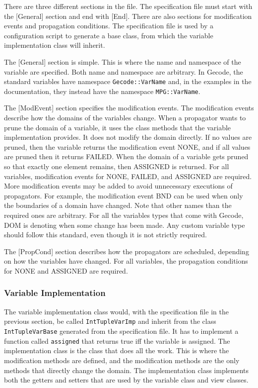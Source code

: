 \documentclass[a4paper,11pt]{article}
\begin{document}
There are three different sections in the file. The specification file must start with the [General] section and end with [End]. There are also sections for modification events and propagation conditions. The specification file is used by a configuration script to generate a base class, from which the variable implementation class will inherit.

The [General] section is simple. This is where the name and namespace of the variable are specified. Both name and namespace are arbitrary. In Gecode, the standard variables have namespace \texttt{Gecode::VarName} and, in the examples in the documentation, they instead have the namespace \texttt{MPG::VarName}.

The [ModEvent] section specifies the modification events. The modification events describe how the domains of the variables change. When a propagator wants to prune the domain of a variable, it uses the class methods that the variable implementation provides. It does not modify the domain directly. If no values are pruned, then the variable returns the modification event NONE, and if all values are pruned then it returns FAILED. When the domain of a variable gets pruned so that exactly one element remains, then ASSIGNED is returned. For all variables, modification events for NONE, FAILED, and ASSIGNED are required. More modification events may be added to avoid unnecessary executions of propagators. For example, the modification event BND can be used when only the boundaries of a domain have changed. Note that other names than the required ones are arbitrary. For all the variables types that come with Gecode, DOM is denoting when some change has been made. Any custom variable type should follow this standard, even though it is not strictly required.

The [PropCond] section describes how the propagators are scheduled, depending on how the variables have changed. For all variables, the propagation conditions for NONE and ASSIGNED are required.

\subsubsection{Variable Implementation}
The variable implementation class would, with the specification file in the previous section, be called \texttt{IntTupleVarImp} and inherit from the class \texttt{IntTupleVarBase} generated from the specification file. It has to implement a function called \texttt{assigned} that returns true iff the variable is assigned. The implementation class is the class that does all the work. This is where the modification methods are defined, and the modification methods are the only methods that directly change the domain. The implementation class implements both the getters and setters that are used by the variable class and view classes.
\end{document}
